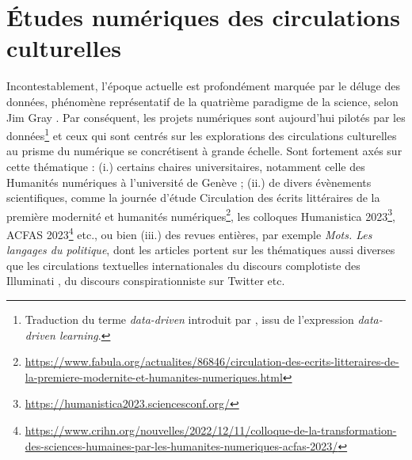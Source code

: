\section{Études numériques des circulations culturelles}
Incontestablement, l'époque actuelle est profondément marquée par le \og{}déluge des données\fg{}, phénomène représentatif de la quatrième paradigme de la science, selon Jim Gray \citep[p.~30]{hey2009jim}. Par conséquent, les projets numériques sont aujourd'hui \og{}pilotés par les données\fg{}\footnote{Traduction du terme \textit{data-driven} introduit par \citet{Johns1991ShouldYB}, issu de l'expression \textit{data-driven learning}.} et ceux qui sont centrés sur les explorations des circulations culturelles au prisme du numérique se concrétisent à grande échelle.
Sont fortement axés sur cette thématique : (i.) certains chaires universitaires, notamment celle des Humanités numériques à l'université de Genève \citep{joyeux2022circulations} ; (ii.) de divers évènements scientifiques, comme la journée d'étude \og{}Circulation des écrits littéraires de la première modernité et humanités numériques\fg{}\footnote{\url{https://www.fabula.org/actualites/86846/circulation-des-ecrits-litteraires-de-la-premiere-modernite-et-humanites-numeriques.html}}, les colloques Humanistica 2023\footnote{\url{https://humanistica2023.sciencesconf.org/}}, \textsc{ACFAS} 2023\footnote{\url{https://www.crihn.org/nouvelles/2022/12/11/colloque-de-la-transformation-des-sciences-humaines-par-les-humanites-numeriques-acfas-2023/}} etc., ou bien (iii.) des revues entières, par exemple \textit{Mots. Les langages du politique}, dont les articles portent sur les thématiques aussi diverses que les circulations textuelles internationales du discours complotiste des \og Illuminati \fg{}  \citep{chaudet2022illuminati}, du discours \og conspirationniste \fg{} sur Twitter \citep{giry2022etudier} etc. 


